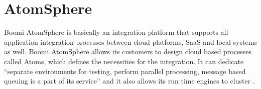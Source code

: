 \section{AtomSphere}

Boomi AtomSphere is basically an integration platform that supports all 
application integration processes between cloud platforms, SaaS and local 
systems as well. Boomi AtomSphere allows its customers to design cloud based 
processes called Atoms, which defines the necessities for the integration.
It can dedicate ``separate environments for testing, perform 
parallel processing, message based queuing is a part of its service'' and it 
also allows its run time engines to cluster 
\cite{hid-sp18-418-AtomSphere-features}. 
